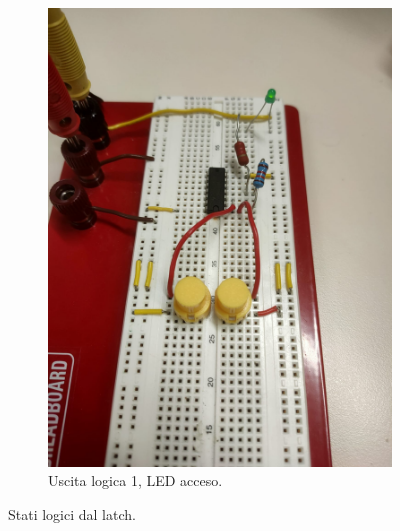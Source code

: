 \documentclass[a4paper,12pt]{article}
\begin{document}
\begin{figure}[H]
\begin{subfigure}[b]{0.47\textwidth}
        \includegraphics[width=\linewidth]{immagini/latch/on.png}
        \caption{Uscita logica 1, LED acceso.}
    \end{subfigure}
    \caption{Stati logici  dal latch.}
    \label{fig:latch_onoff}
\end{figure}
\end{document}
